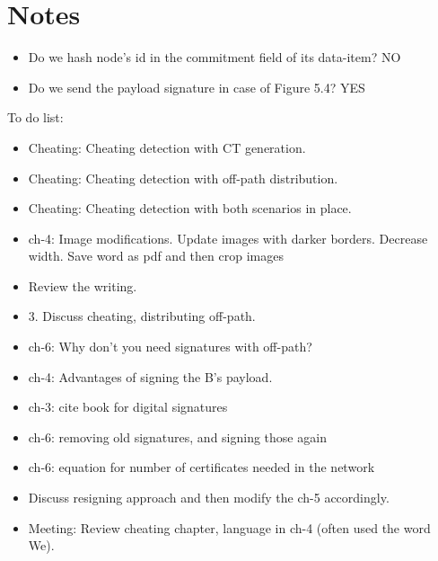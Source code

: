 \chapter{Notes}

\begin{itemize}
	\item Do we hash node's id in the commitment field of its data-item? NO
	\item Do we send the payload signature in case of Figure 5.4? YES
\end{itemize}

To do list:
\begin{itemize}
	\item Cheating: Cheating detection with CT generation.
	\item Cheating: Cheating detection with off-path distribution.
	\item Cheating: Cheating detection with both scenarios in place.

	\item ch-4: Image modifications. Update images with darker borders. Decrease width. Save word as pdf and then crop images
	\item Review the writing.

	\item 3. Discuss cheating, distributing off-path.  
	\item ch-6: Why don't you need signatures with off-path?
	\item ch-4: Advantages of signing the B's payload.

	\item ch-3: cite book for digital signatures

	\item ch-6: removing old signatures, and signing those again
	\item ch-6: equation for number of certificates needed in the network

	\item Discuss resigning approach and then modify the ch-5 accordingly.
	\item Meeting: Review cheating chapter, language in ch-4 (often used the word We).

\end{itemize}